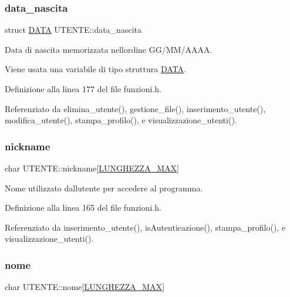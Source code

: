 \subsubsection{\texorpdfstring{data\+\_\+nascita}{data\_nascita}}
{\footnotesize\ttfamily struct \hyperlink{struct_d_a_t_a}{D\+A\+TA} U\+T\+E\+N\+T\+E\+::data\+\_\+nascita}



Data di nascita memorizzata nell\textquotesingle{}ordine G\+G/\+M\+M/\+A\+A\+AA. 

Viene usata una variabile di tipo struttura \hyperlink{struct_d_a_t_a}{D\+A\+TA}. 

Definizione alla linea 177 del file funzioni.\+h.



Referenziato da elimina\+\_\+utente(), gestione\+\_\+file(), inserimento\+\_\+utente(), modifica\+\_\+utente(), stampa\+\_\+profilo(), e visualizzazione\+\_\+utenti().

\mbox{\label{struct_u_t_e_n_t_e_a0ae0027764658fd60ce899a829b7b2fe}} 
\subsubsection{\texorpdfstring{nickname}{nickname}}
{\footnotesize\ttfamily char U\+T\+E\+N\+T\+E\+::nickname\mbox{[}\hyperlink{funzioni_8h_a2cdd71b92d6e869f8b094e32a6da6a62}{L\+U\+N\+G\+H\+E\+Z\+Z\+A\+\_\+\+M\+AX}\mbox{]}}

Nome utilizzato dall\textquotesingle{}utente per accedere al programma. 

Definizione alla linea 165 del file funzioni.\+h.



Referenziato da inserimento\+\_\+utente(), is\+Autenticazione(), stampa\+\_\+profilo(), e visualizzazione\+\_\+utenti().

\mbox{\label{struct_u_t_e_n_t_e_acd2869ae6d739de9978a588124906ae8}} 
\subsubsection{\texorpdfstring{nome}{nome}}
{\footnotesize\ttfamily char U\+T\+E\+N\+T\+E\+::nome\mbox{[}\hyperlink{funzioni_8h_a2cdd71b92d6e869f8b094e32a6da6a62}{L\+U\+N\+G\+H\+E\+Z\+Z\+A\+\_\+\+M\+AX}\mbox{]}}

